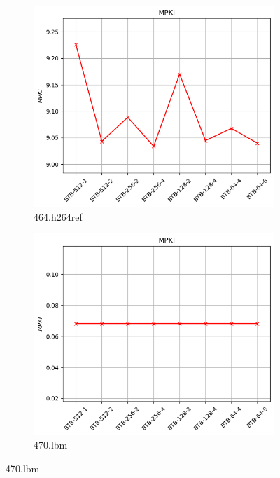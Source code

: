\documentclass{article}
\begin{document}
\begin{figure}[H]
    \vspace{0.5cm} %

    \begin{subfigure}[b]{0.45\textwidth}
        \includegraphics[width=\textwidth]{figures/5_4/464.h264ref.cslab_branch_preds_ref.out.png}
        \caption{464.h264ref}
        \label{fig:plot61}
    \end{subfigure}
    \hfill
    \begin{subfigure}[b]{0.45\textwidth}
        \includegraphics[width=\textwidth]{figures/5_4/470.lbm.cslab_branch_preds_ref.out.png}
        \caption{470.lbm}
        \label{fig:plot62}
    \end{subfigure}


\end{figure}
\end{document}
